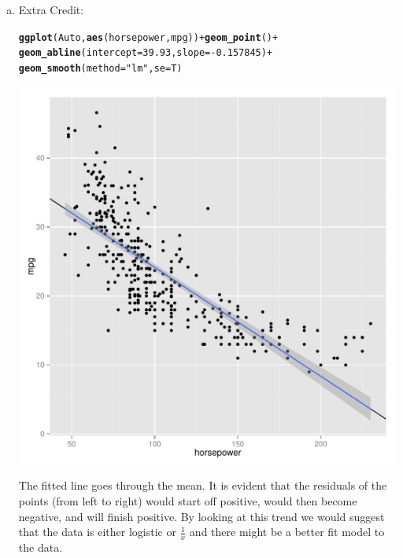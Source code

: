\documentclass{article}\usepackage[]{graphicx}\usepackage[]{color}
\makeatletter
\def\maxwidth{ %
  \ifdim\Gin@nat@width>\linewidth
    \linewidth
  \else
    \Gin@nat@width
  \fi
}
\newcommand{\hlnum}[1]{\textcolor[rgb]{0.686,0.059,0.569}{#1}}%
\newcommand{\hlstr}[1]{\textcolor[rgb]{0.192,0.494,0.8}{#1}}%
\newcommand{\hlopt}[1]{\textcolor[rgb]{0,0,0}{#1}}%
\newcommand{\hlstd}[1]{\textcolor[rgb]{0.345,0.345,0.345}{#1}}%
\newcommand{\hlkwc}[1]{\textcolor[rgb]{0.333,0.667,0.333}{#1}}%
\newcommand{\hlkwd}[1]{\textcolor[rgb]{0.737,0.353,0.396}{\textbf{#1}}}%
\newenvironment{kframe}{%
 \def\at@end@of@kframe{}%
 \ifinner\ifhmode%
  \def\at@end@of@kframe{\end{minipage}}%
  \begin{minipage}{\columnwidth}%
 \fi\fi%
 \def\FrameCommand##1{\hskip\@totalleftmargin \hskip-\fboxsep
 \colorbox{shadecolor}{##1}\hskip-\fboxsep
     \hskip-\linewidth \hskip-\@totalleftmargin \hskip\columnwidth}%
 \MakeFramed {\advance\hsize-\width
   \@totalleftmargin\z@ \linewidth\hsize
   \@setminipage}}%
 {\par\unskip\endMakeFramed%
 \at@end@of@kframe}
\newenvironment{knitrout}{}{} %
\makeatother
\begin{document}
\begin{enumerate}[(a)]
\item
Extra Credit:
\begin{knitrout}
\color{fgcolor}\begin{kframe}
\begin{alltt}
\hlkwd{ggplot}\hlstd{(Auto,} \hlkwd{aes}\hlstd{(horsepower,mpg))}\hlopt{+}\hlkwd{geom_point}\hlstd{()}\hlopt{+}
  \hlkwd{geom_abline}\hlstd{(}\hlkwc{intercept}\hlstd{=}\hlnum{39.93}\hlstd{,} \hlkwc{slope}\hlstd{=}\hlopt{-}\hlnum{0.157845}\hlstd{)}\hlopt{+}
  \hlkwd{geom_smooth}\hlstd{(}\hlkwc{method}\hlstd{=}\hlstr{"lm"}\hlstd{,} \hlkwc{se}\hlstd{=T)}
\end{alltt}
\end{kframe}
\includegraphics[width=\maxwidth]{figure/unnamed-chunk-9-1} 

\end{knitrout}
The fitted line goes through the mean. It is evident that the residuals of the points (from left to right) would start off positive, would then become negative, and will finish positive. By looking at this trend we would suggest that the data is either logistic or $\frac{1}{x}$ and there might be a better fit model to the data.
\end{enumerate}
\end{document}
